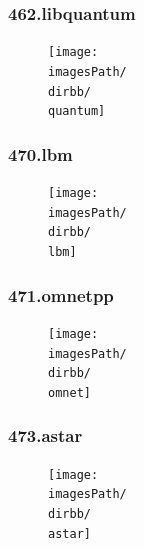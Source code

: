 \documentclass[12pt,a4paper]{article}
\newcommand{\imagesPath}{/home/nick/arch-ntua/ex02/graphs}
\newcommand{\quantum}{462.libquantum.cslab_branch_predictors.out.pdf}
\newcommand{\lbm}{470.lbm.cslab_branch_predictors.out.pdf}
\newcommand{\omnet}{471.omnetpp.cslab_branch_predictors.out.pdf}
\newcommand{\astar}{473.astar.cslab_branch_predictors.out.pdf}
\newcommand{\dirbb}{4.2/ii}
\begin{document}
				\subsubsection{462.libquantum}
					\begin{figure}[H]
						\begin{center}
							 \texttt{[image: \\imagesPath/\\dirbb/\\quantum]}
						\end{center}
					\end{figure}
				
				\subsubsection{470.lbm}
					\begin{figure}[H]
						\begin{center}
							 \texttt{[image: \\imagesPath/\\dirbb/\\lbm]}
						\end{center}
					\end{figure}
				
				\subsubsection{471.omnetpp}
					\begin{figure}[H]
						\begin{center}
							 \texttt{[image: \\imagesPath/\\dirbb/\\omnet]}
						\end{center}
					\end{figure}
				
				\subsubsection{473.astar}
					\begin{figure}[H]
						\begin{center}
							 \texttt{[image: \\imagesPath/\\dirbb/\\astar]}
						\end{center}
					\end{figure}
				
\end{document}
